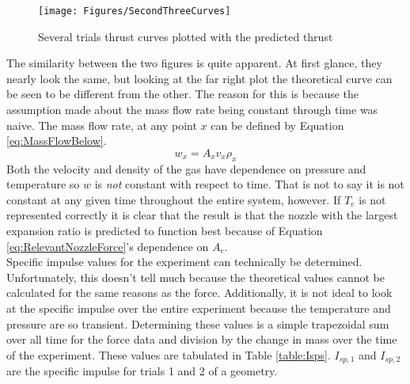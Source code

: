 \begin{figure}[h!]
\centering
\texttt{[image: Figures/SecondThreeCurves]}
\caption{Several trials thrust curves plotted with the predicted thrust}
\label{fig:SecondThreeCurves}
\end{figure}
The similarity between the two figures is quite apparent. At first glance, they nearly look the same, but looking at the far right plot the theoretical curve can be seen to be different from the other. The reason for this is because the assumption made about the mass flow rate being constant through time was naive. The mass flow rate, at any point $x$  can be defined by Equation \ref{eq:MassFlowBelow}.
\begin{equation}\label{eq:MassFlowBelow}
w_x=A_x v_x \rho_x
\end{equation}
Both the velocity and density of the gas have dependence on pressure and temperature so $w$ is \textit{not} constant with respect to time. That is not to say it is not constant at any given time throughout the entire system, however. If $T_e$ is not represented correctly it is clear that the result is that the nozzle with the largest expansion ratio is predicted to function best because of Equation \ref{eq:RelevantNozzleForce}'s dependence on $A_e$. \\
Specific impulse values for the experiment can technically be determined. Unfortunately, this doesn't tell much because the theoretical values cannot be calculated for the same reasons as the force. Additionally, it is not ideal to look at the specific impulse over the entire experiment because the temperature and pressure are so transient. Determining these values is a simple trapezoidal sum over all time for the force data and division by the change in mass over the time of the experiment. These values are tabulated in Table \ref{table:Isps}. $I_{sp,1}$ and $I_{sp,2}$ are the specific impulse for trials 1 and 2 of a geometry. 
